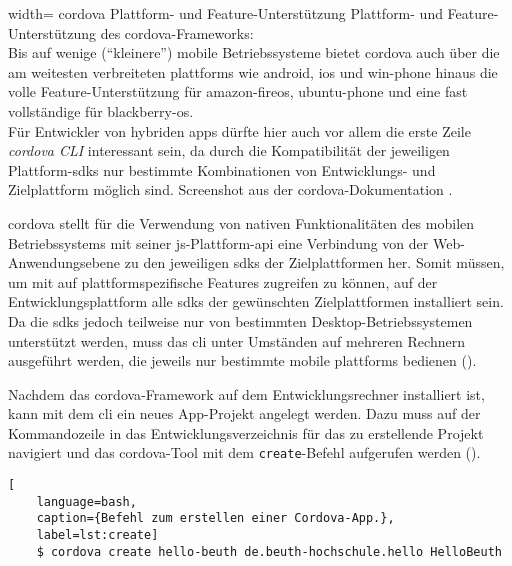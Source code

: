 
	{width=\fullimagesize}
	{\gls{cordova} Plattform- und Feature-Unterstützung}
	{Plattform- und Feature-Unterstützung des \gls{cordova}-Frameworks: \\ 
	Bis auf wenige (\enquote{kleinere}) mobile Betriebssysteme bietet \gls{cordova} auch über die am weitesten verbreiteten \glspl{plattform} wie \gls{android}, \gls{ios} und \gls{win-phone} hinaus die volle Feature-Unterstützung für \gls{amazon-fireos}, \gls{ubuntu-phone} und eine fast vollständige für \gls{blackberry-os}.\\
	Für Entwickler von hybriden \glspl{app} dürfte hier auch vor allem die erste Zeile \emph{cordova CLI} interessant sein, da durch die Kompatibilität der jeweiligen Plattform-\glspl{sdk} nur bestimmte Kombinationen von Entwicklungs- und Zielplattform möglich sind.}
	{Screenshot aus der \gls{cordova}-Dokumentation \cite{Cordova-Docs_Platform-Support}.}


\gls{cordova} stellt für die Verwendung von nativen Funktionalitäten des mobilen Betriebssystems mit seiner \gls{js}-Plattform-\gls{api} eine Verbindung von der Web-Anwendungsebene zu den jeweiligen \glspl{sdk} der Zielplattformen her.
Somit müssen, um mit auf plattformspezifische Features zugreifen zu können, auf der Entwicklungsplattform alle \glspl{sdk} der gewünschten Zielplattformen installiert sein.
Da die \glspl{sdk} jedoch teilweise nur von bestimmten Desktop-Betriebssystemen unterstützt werden, muss das \gls{cli} unter Umständen auf mehreren Rechnern ausgeführt werden, die jeweils nur bestimmte mobile \glspl{plattform} bedienen ().


Nachdem das \gls{cordova}-Framework auf dem Entwicklungsrechner installiert ist, kann mit dem \gls{cli} ein neues App-Projekt angelegt werden. 
Dazu muss auf der Kommandozeile in das Entwicklungsverzeichnis für das zu erstellende Projekt navigiert und das \gls{cordova}-Tool mit dem \lstinline|create|-Befehl aufgerufen werden ().

\begin{lstlisting}[
	language=bash,
	caption={Befehl zum erstellen einer Cordova-App.},
	label=lst:create]
	$ cordova create hello-beuth de.beuth-hochschule.hello HelloBeuth
\end{lstlisting}

